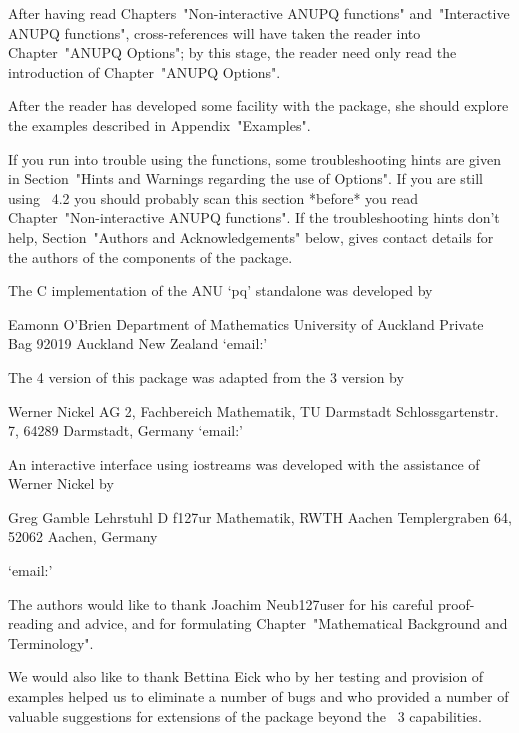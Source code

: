 After   having   read    Chapters~"Non-interactive    ANUPQ    functions"
and~"Interactive ANUPQ functions", cross-references will have  taken  the
reader into Chapter~"ANUPQ Options"; by this stage, the reader need  only
read the introduction of Chapter~"ANUPQ Options".

After the reader has developed some facility with the  {\ANUPQ}  package,
she should explore the examples described in Appendix~"Examples".

If  you  run  into   trouble   using   the   {\ANUPQ}   functions,   some
troubleshooting hints are given in Section~"Hints and Warnings  regarding
the use of Options".  If  you  are  still  using  {\GAP}~4.2  you  should
probably scan this section  *before*  you  read  Chapter~"Non-interactive
ANUPQ   functions".   If   the   troubleshooting   hints   don't    help,
Section~"Authors and Acknowledgements" below, gives contact  details  for
the authors of the components of the {\ANUPQ} package.


The C implementation of the ANU `pq' standalone was developed by

\begintt
Eamonn O'Brien
Department of Mathematics
University of Auckland
Private Bag 92019
Auckland
New Zealand
\endtt
{}`email:' 

The {\GAP} 4 version of this package was adapted from the {\GAP} 3
version by  

\begintt
Werner Nickel
AG 2, Fachbereich Mathematik, TU Darmstadt
Schlossgartenstr. 7, 64289 Darmstadt, Germany
\endtt
{}`email:' 

An  interactive  interface  using  iostreams  was  developed   with   the
assistance of Werner Nickel by

{}Greg Gamble
Lehrstuhl D f\accent127ur Mathematik, RWTH Aachen
Templergraben 64, 52062 Aachen, Germany

{}`email:'  

The authors would  like  to  thank  Joachim  Neub\accent127user  for  his
careful    proof-reading    and    advice,    and     for     formulating
Chapter~"Mathematical Background and Terminology".

We would also like to thank Bettina Eick who by her testing and provision
of examples helped us to eliminate a number of bugs and  who  provided  a
number of valuable suggestions for extensions of the package  beyond  the
{\GAP}~3 capabilities. 

